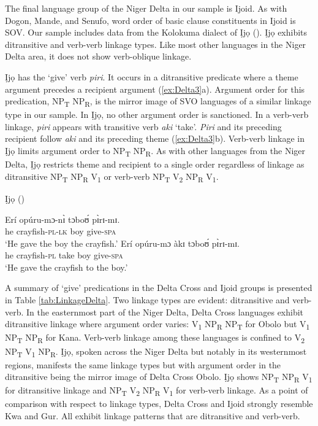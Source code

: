 \documentclass[output=paper,colorlinks,citecolor=brown]{langscibook}
\begin{document}
The final language group of the Niger Delta in our sample is  Ijoid. As with Dogon, Mande, and Senufo, word order of basic clause constituents in Ijoid is SOV. Our sample includes data from the Kolokuma dialect of Ịjọ (\cite{Williamson1965}). Ịjọ exhibits ditransitive and verb-verb linkage types. Like most other languages in the Niger Delta area, it does not show verb-oblique linkage.

Ịjọ has the ‘give’ verb \textit{piri}. It occurs in a ditransitive predicate where a theme argument precedes a recipient argument (\ref{ex:Delta3}a). Argument order for this predication, NP\textsubscript{T} NP\textsubscript{R}, is the mirror image of SVO languages of a similar linkage type in our sample. In Ịjọ, no other argument order is sanctioned. In a verb-verb linkage, \textit{piri} appears with transitive verb \textit{aki} ‘take’. \textit{Piri} and its preceding recipient follow \textit{aki} and its preceding theme (\ref{ex:Delta3}b). Verb-verb linkage in Ịjọ limits argument order to NP\textsubscript{T} NP\textsubscript{R}. As with other languages from the Niger Delta, Ịjọ restricts theme and recipient to a single order regardless of linkage as ditransitive NP\textsubscript{T} NP\textsubscript{R} V\textsubscript{1} or verb-verb NP\textsubscript{T} V\textsubscript{2} NP\textsubscript{R} V\textsubscript{1}.

\ea \label{ex:Delta3} Ịjọ (\cite[54]{Williamson1965})
\begin{xlist}
\ex
\gll Erí		opúru-mɔ-nɪ̀		tɔboʊ́		pɪ̀rɪ-mɪ.\\
	he		crayfish-\textsc{pl}-\textsc{lk}		boy			give-\textsc{spa}\\
\glt			‘He gave the boy the crayfish.’
\ex 
\gll Erí		opúru-mɔ		àkɪ		tɔboʊ́		pɪ̀rɪ-mɪ.\\
				he		crayfish-\textsc{pl}	take		boy			give-\textsc{spa} \\
\glt						‘He gave the crayfish to the boy.’
\end{xlist}
\z

A summary of ‘give’ predications in the Delta Cross and Ijoid groups is presented in Table \ref{tab:LinkageDelta}. Two linkage types are evident: ditransitive and verb-verb. In the easternmost part of the Niger Delta, Delta Cross languages exhibit ditransitive linkage where argument order varies: V\textsubscript{1} NP\textsubscript{R} NP\textsubscript{T} for Obolo but V\textsubscript{1} NP\textsubscript{T} NP\textsubscript{R} for Kana. Verb-verb linkage among these languages is confined to V\textsubscript{2} NP\textsubscript{T} V\textsubscript{1} NP\textsubscript{R}. Ịjọ, spoken across the Niger Delta but notably in its westernmost regions, manifests the same linkage types but with argument order in the ditransitive being the mirror image of Delta Cross Obolo. Ịjọ shows NP\textsubscript{T} NP\textsubscript{R} V\textsubscript{1} for ditransitive linkage and NP\textsubscript{T} V\textsubscript{2} NP\textsubscript{R} V\textsubscript{1} for verb-verb linkage. As a point of comparison with respect to linkage types, Delta Cross and Ijoid strongly resemble Kwa and Gur. All exhibit linkage patterns that are ditransitive and verb-verb.
\end{document}
